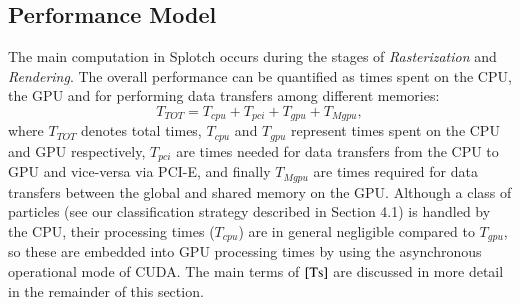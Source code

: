 \documentclass[1p]{elsarticle}
\begin{document}
\subsection{Performance Model}
\label{sec:model}

The main computation in Splotch occurs during the stages of {\it Rasterization} and {\it Rendering}.
%
The overall performance can be quantified as times spent on the CPU, the GPU
and for performing data transfers among different memories:
\begin{equation}\label{Ts}
T_{TOT} = T_{cpu} + T_{pci} + T_{gpu} + T_{Mgpu},
\end{equation}
where $T_{TOT}$ denotes total times, 
$T_{cpu}$ and $T_{gpu}$ represent times spent on the CPU and GPU respectively, $T_{pci}$ are times needed for data transfers from the CPU to GPU and vice-versa via PCI-E, and finally $T_{Mgpu}$ are times required for data transfers between the global and shared memory on the GPU. Although a class of particles (see our classification strategy described in Section 4.1) is handled by the CPU, their processing times ($T_{cpu}$) are in general negligible compared to $T_{gpu}$, so these are embedded into GPU processing times by using the asynchronous operational mode of CUDA. The main terms of $\eqref{Ts}$ are discussed in more detail in the remainder of this section.  
\end{document}
